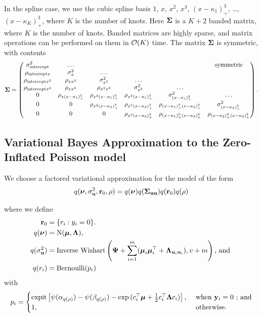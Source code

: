 In the spline case, we use the cubic spline basis $1$, $x$, $x^2$, $x^3$, $(x -
\kappa_1)^3_+$, \ldots, $(x - \kappa_K)^3_+$, where $K$ is the number of knots.
Here ${\boldsymbol \Sigma}$ is a $K + 2$ banded matrix, where $K$ is the number of knots.
Banded matrices are highly sparse, and matrix operations can be performed on
them in $\mathcal{O}(K)$ time. The matrix ${\boldsymbol \Sigma}$ is symmetric, with contents
\[
	{\boldsymbol \Sigma} =
	\begin{pmatrix}
		\sigma^2_{\text{intercept}} & \ldots                      &                             &                               &                                          & \text{symmetric}              \\
		\rho_{\text{intercept} x} & \sigma^2_x & \ldots\\
		\rho_{\text{intercept} x^2} & \rho_{x x^2} & \sigma^2_{x^2} & \ldots \\
		\rho_{\text{intercept} x^3} & \rho_{x x^3} & \rho_{x^2 x^3} & \sigma^2_{x^3} & \ldots \\
		0                           & \rho_{x (x - \kappa_1)^3_+} & \rho_{x^2 (x-\kappa_1)_+^3} & \rho_{x^3 (x - \kappa_1)_+^3} & \sigma^2_{(x - \kappa_1)_+^3}            & \ldots                        \\
		0                           & 0                           & \rho_{x^2 (x-\kappa_2)_+^3} & \rho_{x^3 (x-\kappa_2)_+^3}   & \rho_{(x-\kappa_1)_+^3 (x-\kappa_2)_+^3} & \sigma^2_{(x - \kappa_2)_+^3} \\
		0 & 0 & 0 & \rho_{x^3 (x - \kappa_3)_+^3} & \rho_{(x - \kappa_1)_+^3 (x - \kappa_3)_+^3} & \rho_{(x - \kappa_2)_+^3 (x - \kappa_3)_+^3}
	\end{pmatrix}.
\]

\subsection{Variational Bayes Approximation to the Zero-Inflated Poisson model}
We choose a factored variational approximation for the model of the form 
\[
	q({\boldsymbol \nu}, \sigma_{{\bf u}}^2,{\bf r}_0, \rho) = q({\boldsymbol \nu}) q({\boldsymbol \Sigma}_{{\bf u} {\bf u}}) q({\bf r}_0) q(\rho)
\]

\noindent where we define 
\begin{align*}
    {\bf r}_0 &= \{ r_i : y_i = 0 \}. \\
    q({\boldsymbol \nu}) &= \text{N}({\boldsymbol \mu}, {\boldsymbol \Lambda}), \\ 
    q(\sigma_{{\bf u}}^2) &= \text{Inverse Wishart}\left({\boldsymbol \Psi} + \sum_{i=1}^m ({\boldsymbol \mu}_i {\boldsymbol \mu}_i^\top + {\boldsymbol \Lambda}_{{\bf u}_i {\bf u}_i}), v + m \right) \mbox{, and } \\ 
    q(r_i) &= \text{Bernoulli}{(p_i)} 
\end{align*}
with
$$p_i = 
\begin{cases}
    \text{expit}\left[ \psi{(\alpha_{q(\rho)})} - \psi{(\beta_{q(\rho)})} - \exp{(c_i^\top{\boldsymbol\mu}+ \frac{1}{2} c_i^\top {\boldsymbol\Lambda}c_i)} \right],& \text{ when } {\bf y}_i = 0\text{ ; and}\\
1,& \text{ otherwise.}
\end{cases}$$

